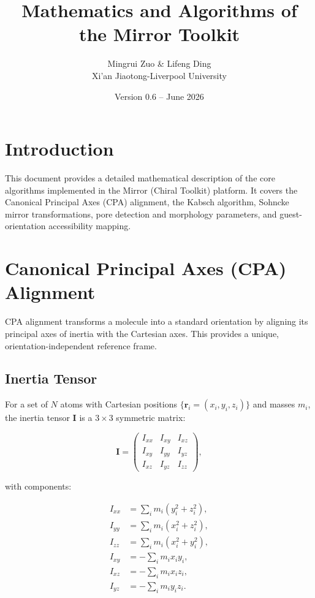 \documentclass[11pt,a4paper]{article}
\title{\textbf{Mathematics and Algorithms of the Mirror Toolkit}}
\author{Mingrui Zuo \& Lifeng Ding\\Xi'an Jiaotong-Liverpool University}
\date{Version 0.6 -- June 2026}
\newcommand{\vect}[1]{\bm{#1}}
\begin{document}
\maketitle
\tableofcontents
\newpage

\section{Introduction}

This document provides a detailed mathematical description of the core
algorithms implemented in the Mirror (Chiral Toolkit) platform.  It
covers the Canonical Principal Axes (CPA) alignment, the Kabsch
algorithm, Sohncke mirror transformations, pore detection and morphology
parameters, and guest-orientation accessibility mapping.

\section{Canonical Principal Axes (CPA) Alignment}

CPA alignment transforms a molecule into a standard orientation by
aligning its principal axes of inertia with the Cartesian axes.  This
provides a unique, orientation-independent reference frame.

\subsection{Inertia Tensor}

For a set of $N$ atoms with Cartesian positions
$\{\vect{r}_i = (x_i, y_i, z_i)\}$ and masses $m_i$, the inertia tensor
$\vect{I}$ is a $3 \times 3$ symmetric matrix:

\begin{equation}
\vect{I} = \begin{pmatrix}
I_{xx} & I_{xy} & I_{xz} \\
I_{xy} & I_{yy} & I_{yz} \\
I_{xz} & I_{yz} & I_{zz}
\end{pmatrix},
\end{equation}

with components:

\begin{align}
I_{xx} &= \sum_i m_i (y_i^2 + z_i^2), \\
I_{yy} &= \sum_i m_i (x_i^2 + z_i^2), \\
I_{zz} &= \sum_i m_i (x_i^2 + y_i^2), \\
I_{xy} &= -\sum_i m_i x_i y_i, \\
I_{xz} &= -\sum_i m_i x_i z_i, \\
I_{yz} &= -\sum_i m_i y_i z_i.
\end{align}
\end{document}
